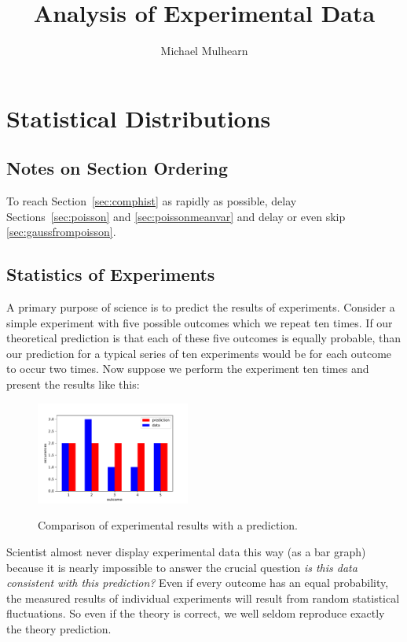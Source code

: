 \documentclass[12pt,oneside]{book}
\begin{document}
\title{Analysis of Experimental Data}
\author{Michael Mulhearn}

\maketitle

\chapter{Statistical Distributions}

\section{Notes on Section Ordering}

To reach Section~\ref{sec:comphist} as rapidly as possible, delay
Sections~\ref{sec:poisson} and \ref{sec:poissonmeanvar} and delay or
even skip \ref{sec:gaussfrompoisson}.

\section{Statistics of Experiments}

A primary purpose of science is to predict the results of experiments.
Consider a simple experiment with five possible outcomes which we
repeat ten times.  If our theoretical prediction is that each of these
five outcomes is equally probable, than our prediction for a typical
series of ten experiments would be for each outcome to occur two
times.  Now suppose we perform the experiment ten times and present
the results like this:

\begin{figure}[htbp]
\begin{center}
{\includegraphics[width=0.45\textwidth]{figs/intro.pdf}}
\end{center}
\caption{\label{fig:intro} Comparison of experimental results with a prediction.}
\end{figure}

Scientist almost never display experimental data this way (as a bar
graph) because it is nearly impossible to answer the crucial question
{\em is this data consistent with this prediction?}  Even if every
outcome has an equal probability, the measured results of individual
experiments will result from random statistical fluctuations.  So even
if the theory is correct, we well seldom reproduce exactly the theory
prediction.
\end{document}
